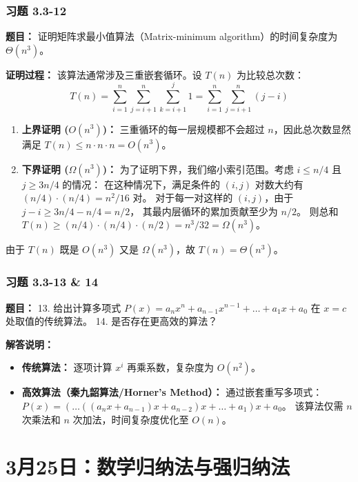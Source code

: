 \documentclass[11pt,UTF8]{article}
\begin{document}
\subsubsection*{习题 3.3-12}
\textbf{题目：} 证明矩阵求最小值算法（Matrix-minimum algorithm）的时间复杂度为 $\Theta(n^3)$。

\textbf{证明过程：}
该算法通常涉及三重嵌套循环。设 $T(n)$ 为比较总次数：
\[ T(n) = \sum_{i=1}^{n} \sum_{j=i+1}^{n} \sum_{k=i+1}^{j} 1 = \sum_{i=1}^{n} \sum_{j=i+1}^{n} (j - i) \]
\begin{enumerate}[1.]
    \item \textbf{上界证明 ($O(n^3)$)：}
    三重循环的每一层规模都不会超过 $n$，因此总次数显然满足 $T(n) \le n \cdot n \cdot n = O(n^3)$。
    
    \item \textbf{下界证明 ($\Omega(n^3)$)：}
    为了证明下界，我们缩小索引范围。考虑 $i \le n/4$ 且 $j \ge 3n/4$ 的情况：
    在这种情况下，满足条件的 $(i, j)$ 对数大约有 $(n/4) \cdot (n/4) = n^2/16$ 对。
    对于每一对这样的 $(i, j)$，由于 $j - i \ge 3n/4 - n/4 = n/2$，
    其最内层循环的累加贡献至少为 $n/2$。
    则总和 $T(n) \ge (n/4) \cdot (n/4) \cdot (n/2) = n^3/32 = \Omega(n^3)$。
\end{enumerate}
由于 $T(n)$ 既是 $O(n^3)$ 又是 $\Omega(n^3)$，故 $T(n) = \Theta(n^3)$。

\subsubsection*{习题 3.3-13 \& 14}
\textbf{题目：} 
13. 给出计算多项式 $P(x) = a_nx^n + a_{n-1}x^{n-1} + \dots + a_1x + a_0$ 在 $x=c$ 处取值的传统算法。
14. 是否存在更高效的算法？

\textbf{解答说明：}
\begin{itemize}
    \item \textbf{传统算法：} 逐项计算 $x^i$ 再乘系数，复杂度为 $O(n^2)$。
    \item \textbf{高效算法（秦九韶算法/Horner's Method）：}
    通过嵌套重写多项式：$P(x) = (\dots((a_nx + a_{n-1})x + a_{n-2})x + \dots + a_1)x + a_0$。
    该算法仅需 $n$ 次乘法和 $n$ 次加法，时间复杂度优化至 $O(n)$。
\end{itemize}



\section{3月25日：数学归纳法与强归纳法}
\end{document}
